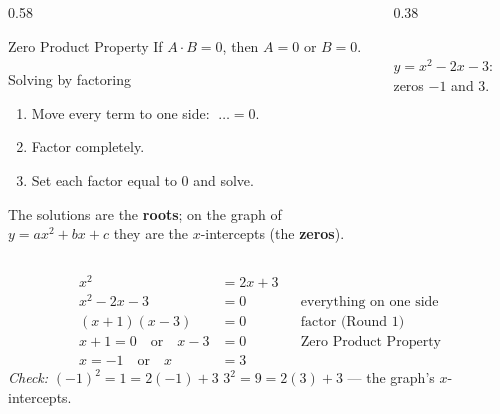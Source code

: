 \documentclass[aspectratio=169, 11pt]{beamer}
\newcommand{\lgrid}[4]{%
  \draw[step=1, linegray!45, thin] (#1,#3) grid (#2,#4);
  \draw[->, thick, charcoal] (#1,0)--(#2,0) node[below right, font=\tiny]{$x$};
  \draw[->, thick, charcoal] (0,#3)--(0,#4) node[left, font=\tiny]{$y$};}
\begin{document}
\begin{frame}[t, plain]
  \begin{columns}[T]
    \begin{column}{0.58\textwidth}
      \begin{block}{Zero Product Property}
        If $A\cdot B=0$, then $A=0$ or $B=0$.
      \end{block}
      \vspace{2pt}
      \begin{block}{Solving by factoring}
        \begin{enumerate}\setlength{\itemsep}{1pt}
          \item Move every term to one side: $\;\ldots=0$.
          \item Factor completely.
          \item Set each factor equal to $0$ and solve.
        \end{enumerate}
        The solutions are the \textbf{roots}; on the graph of $y=ax^2+bx+c$ they are the
        $x$-intercepts (the \textbf{zeros}).
      \end{block}
    \end{column}
    \begin{column}{0.38\textwidth}
      \centering
      \\[-2pt]
      {\scriptsize $y=x^2-2x-3$: zeros $-1$ and $3$.}
    \end{column}
  \end{columns}
\end{frame}

\begin{frame}[t, plain]
  \[
  \begin{aligned}
    x^2 &= 2x+3 \\
    x^2-2x-3 &= 0            && \text{everything on one side} \\
    (x+1)(x-3) &= 0          && \text{factor (Round 1)} \\
    x+1=0 \quad\text{or}\quad x-3 &= 0 && \text{Zero Product Property} \\
    x=-1 \quad\text{or}\quad x &= 3
  \end{aligned}
  \]
  \pause
  \emph{Check:} $(-1)^2=1=2(-1)+3$ \checkmark \quad $3^2=9=2(3)+3$ \checkmark \quad --- the
  graph's $x$-intercepts.
\end{frame}
\end{document}
